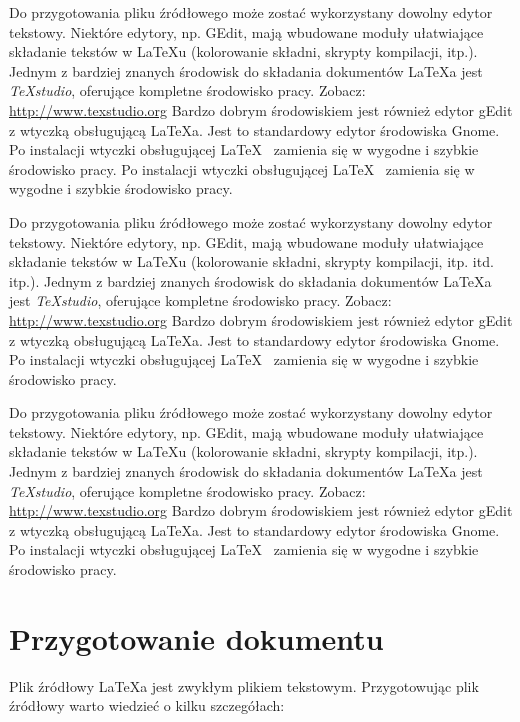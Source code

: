 Do przygotowania pliku źródłowego może zostać wykorzystany dowolny edytor tekstowy. Niektóre edytory, np. GEdit, mają wbudowane moduły ułatwiające składanie tekstów w LaTeXu (kolorowanie składni, skrypty kompilacji, itp.).
Jednym z bardziej znanych środowisk do składania dokumentów  \LaTeX a jest {\em TeXstudio}, oferujące kompletne środowisko pracy. Zobacz: \url{http://www.texstudio.org}
Bardzo dobrym środowiskiem jest również edytor gEdit z wtyczką obsługującą \LaTeX a. Jest to standardowy edytor środowiska Gnome. Po instalacji wtyczki obsługującej \LaTeX~ zamienia się w wygodne i szybkie środowisko pracy.
Po instalacji wtyczki obsługującej \LaTeX~ zamienia się w wygodne i szybkie środowisko pracy.

Do przygotowania pliku źródłowego może zostać wykorzystany dowolny edytor tekstowy. Niektóre edytory, np. GEdit, mają wbudowane moduły ułatwiające składanie tekstów w LaTeXu (kolorowanie składni, skrypty kompilacji, itp. itd. itp.).
Jednym z bardziej znanych środowisk do składania dokumentów  \LaTeX a jest {\em TeXstudio}, oferujące kompletne środowisko pracy. Zobacz: \url{http://www.texstudio.org}
Bardzo dobrym środowiskiem jest również edytor gEdit z wtyczką obsługującą \LaTeX a. Jest to standardowy edytor środowiska Gnome. Po instalacji wtyczki obsługującej \LaTeX~ zamienia się w wygodne i szybkie środowisko pracy.

Do przygotowania pliku źródłowego może zostać wykorzystany dowolny edytor tekstowy. Niektóre edytory, np. GEdit, mają wbudowane moduły ułatwiające składanie tekstów w LaTeXu (kolorowanie składni, skrypty kompilacji, itp.).
Jednym z bardziej znanych środowisk do składania dokumentów  \LaTeX a jest {\em TeXstudio}, oferujące kompletne środowisko pracy. Zobacz: \url{http://www.texstudio.org}
Bardzo dobrym środowiskiem jest również edytor gEdit z wtyczką obsługującą \LaTeX a. Jest to standardowy edytor środowiska Gnome. Po instalacji wtyczki obsługującej \LaTeX~ zamienia się w wygodne i szybkie środowisko pracy.


\section{Przygotowanie dokumentu}
\label{sec:przygotowanieDokumentu}

Plik źródłowy \LaTeX a jest zwykłym plikiem tekstowym. Przygotowując plik
źródłowy warto wiedzieć o kilku szczegółach:

